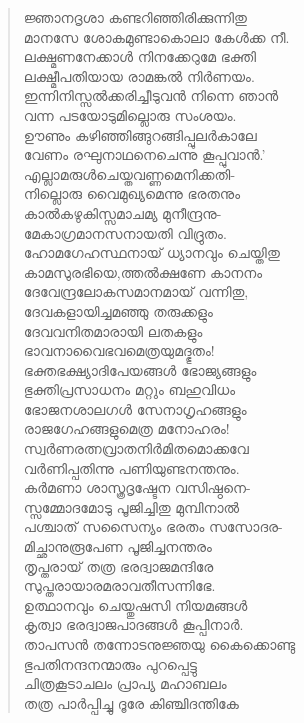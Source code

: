 \begin{verse}
ജ്ഞാനദൃശാ കണ്ടറിഞ്ഞിരിക്കുന്നിതു\\
മാനസേ ശോകമുണ്ടാകൊലാ കേള്‍ക്ക നീ.\\
ലക്ഷ്മണനേക്കാള്‍ നിനക്കേറുമേ ഭക്തി\\
ലക്ഷ്മീപതിയായ രാമങ്കല്‍ നിര്‍ണയം.\\
ഇന്നിനിസ്സല്‍ക്കരിച്ചീടുവന്‍ നിന്നെ ഞാന്‍\\
വന്ന പടയോടുമില്ലൊരു സംശയം.\\
ഊണും കഴിഞ്ഞിങ്ങുറങ്ങിപ്പുലര്‍കാലേ\\
വേണം രഘുനാഥനെചെന്നു കൂപ്പുവാന്‍.’\\
എല്ലാമരുള്‍ചെയ്തവണ്ണമെനിക്കതി-\\
നില്ലൊരു വൈമുഖ്യമെന്നു ഭരതനും\\
കാല്‍കഴുകിസ്സമാചമ്യ മുനീന്ദ്രനു-\\
മേകാഗ്രമാനസനായതി വിദ്രുതം.\\
ഹോമഗേഹസ്ഥനായ് ധ്യാനവും ചെയ്തിതു\\
കാമസുരഭിയെ,ത്തല്‍ക്ഷണേ കാനനം\\
ദേവേന്ദ്രലോകസമാനമായ് വന്നിതു,\\
ദേവകളായിച്ചമഞ്ഞു തരുക്കളും\\
ദേവവനിതമാരായി ലതകളും\\
ഭാവനാവൈഭവമെത്രയുമദ്ഭുതം!\\
ഭക്തഭക്ഷ്യാദിപേയങ്ങള്‍ ഭോജ്യങ്ങളും\\
ഭുക്തിപ്രസാധനം മറ്റും ബഹുവിധം\\
ഭോജനശാലഗള്‍ സേനാഗൃഹങ്ങളും\\
രാജഗേഹങ്ങളുമെത്ര മനോഹരം!\\
സ്വര്‍ണരത്നവ്രാതനിര്‍മിതമൊക്കവേ\\
വര്‍ണിപ്പതിന്നു പണിയുണ്ടനന്തനും.\\
കര്‍മണാ ശാസ്ത്രദൃഷ്ടേന വസിഷ്ഠനെ-\\
സ്സമ്മോദമോടു പൂജിച്ചിതു മുമ്പിനാല്‍\\
പശ്ചാത് സസൈന്യം ഭരതം സസോദര-\\
മിച്ഛാനുരൂപേണ പൂജിച്ചനന്തരം\\
തൃപ്തരായ് തത്ര ഭരദ്വാജമന്ദിരേ\\
സുപ്തരായാരമരാവതീസന്നിഭേ.\\
ഉത്ഥാനവും ചെയ്തുഷസി നിയമങ്ങള്‍\\
കൃത്വാ ഭരദ്വാജപാദങ്ങള്‍ കൂപ്പിനാര്‍.\\
താപസന്‍ തന്നോടനുജ്ഞയു കൈക്കൊണ്ടു\\
ഭുപതിനന്ദനന്മാരും പുറപ്പെട്ടു\\
ചിത്രകൂടാചലം പ്രാപ്യ മഹാബലം\\
തത്ര പാര്‍പ്പിച്ചു ദൂരേ കിഞ്ചിദന്തികേ\\

\end{verse}
